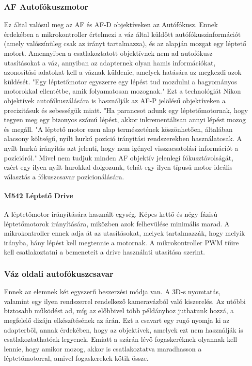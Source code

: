 \subsubsection{AF Autofókuszmotor}
Ez által valósul meg az AF és AF-D objektíveken az Autófókusz. Ennek érdekében a mikrokontroller értelmezi a váz által küldött autófókuszinformációt (amely valószínüleg csak az irányt tartalmazza), és az alapján mozgat egy léptető motort. Amennyiben a csatlakoztatott objektívnek nem ad autofókusz utasításokat a váz, annyiban az adapternek olyan hamis információkat, azonosítási adatokat kell a váznak küldenie, amelyek hatására az megkezdi azok küldését. "Egy léptetőmotor egyszerre egy lépést tud mozdulni a hagyományos motorokkal ellentétbe, amik folyamatosan mozognak."\cite{parmar2017design} Ezt a technológiát Nikon objektívek autofókuszálására is használják az AF-P jelölésű objektíveken \cite{Nikon_AF} a precizitásuk és sebességük miatt. "Ha parancsot adunk egy léptetőmotornak, hogy tegyen meg egy bizonyos számú lépést, akkor inkrementálisan annyi lépést mozog és megáll. "A léptető motor ezen alap természetének köszönhetően, általában alacsony költségű, nyílt hurkú pozíció irányitási rendszerekben használatosak. A nyílt hurkú irányítás azt jelenti, hogy nem igényel visszacsatolási információt a pozícióról." \cite{parmar2017design} Mivel nem tudjuk minden AF objektív jelenlegi fókusztávolságát\cite{Nikon_AF}, ezért egy ilyen nyílt hurokkal dolgozunk, tehát egy ilyen típusú motor ideális választás a fókuszcsavar pozícionálására.
\paragraph{M542 Léptető Drive}\cite{parmar2017design}
A léptetőmotor irányítására használt egység. Képes kettő és négy fázisú léptetőmotorok irányítására, miközben azok felhevülése minimális marad. A mikrokontroller ennek adja át az utasításokat, melyek tartalmazzák, hogy melyik irányba, hány lépést kell megtennie a motornak.\cite{parmar2017design} A mikrokontroller PWM tűire kell csatlakoztatni a bemeneteit a drive használati utasítása szerint\cite{drive}.

\subsubsection{Váz oldali autofókuszcsavar}
Ennek az elemnek két egyszerű beszerzési módja van. A 3D-s nyomtatás, valamint egy ilyen rendszerrel rendelkező kameravázból való kiszerelés. Az utóbbi biztosabb működést ad, míg az előbbivel több példányhoz juthatunk hozzá, a megfelelő dizájn elkészítésének az árán. Ezt  a csavart egy rugó nyomja ki az adapterből, annak érdekében, hogy az objektívek, amelyek ezt nem használják is csatlakoztathatóak legyenek. Emiatt a szárán lévő fogaskeréknek olyannak kell lennie, hogy amikor mozog, akkor is csatlakoztatva maradhasson a léptetőmotorral, amivel fogaskerekek kötik össze.

